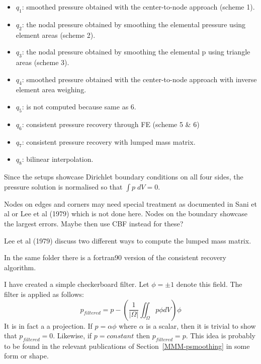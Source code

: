 \begin{itemize}
\item $q_1$: smoothed pressure obtained with the  center-to-node approach (scheme 1).

\item $q_2$: the nodal pressure obtained by smoothing the elemental pressure using element areas (scheme 2).

\item $q_3$: the nodal pressure obtained by smoothing the elemental p using triangle areas (scheme 3).

\item $q_4$: smoothed pressure obtained with the center-to-node approach with inverse element area weighing.

\item $q_5$: is not computed because same as 6.

\item $q_6$: consistent pressure recovery through FE (scheme 5 \& 6)

\item $q_7$: consistent pressure recovery with lumped mass matrix. 

\item $q_8$: bilinear interpolation. 

\end{itemize}

Since the setups showcase Dirichlet boundary conditions on all four sides, 
the pressure solution is normalised so that $\int p\; dV =0 $.

\begin{remark}
Nodes on edges and corners may need special treatment as documented in Sani et al \cite{sagl81a} or
Lee et al (1979) \cite{legs79} which is not done here.  
Nodes on the boundary showcase the largest errors. Maybe then use CBF instead for these?
\end{remark}

\begin{remark}
Lee et al (1979) \cite{legs79} discuss two different ways to compute the lumped mass matrix. 
\end{remark}

\begin{remark}
In the same folder there is a fortran90 version of the consistent recovery algorithm.
\end{remark}

I have created a simple checkerboard filter. Let $\phi=\pm 1$ denote this field.
The filter is applied as follows:
\[
p_{filtered} = p - \left( \frac{1}{|\Omega|} \iint_\Omega p \phi dV \right) \phi
\]
It is in fact a a projection. If $p=\alpha \phi$  where $\alpha$ is a scalar, then 
it is trivial to show that $p_{filtered} =0$.
Likewise, if $p=constant$ then $p_{filtered}=p$.
This idea is probably to be found in the relevant publications of Section~\ref{MMM-psmoothing}
in some form or shape. 


